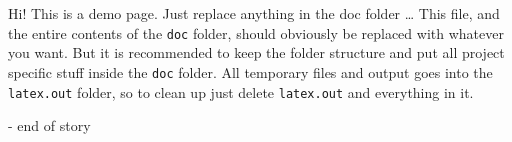 \documentclass[12pt,a4paper]{report}
\begin{document}
\begin{center}
    \huge{Hi! This is a demo page. Just replace anything in the doc folder \ldots}
    \break{}
    \normalsize
    This file, and the entire contents of the \texttt{doc} folder, should obviously be replaced with whatever you want. But it is recommended to keep the folder structure and put all project specific stuff inside the \texttt{doc} folder. All temporary files and output goes into the \texttt{latex.out} folder, so to clean up just delete \texttt{latex.out} and everything in it.
    \vfill
    \vspace{50mm}
    
    \vspace{50mm}
    \break{}
    \huge{- end of story}
    \vfill
\end{center}
\end{document}
